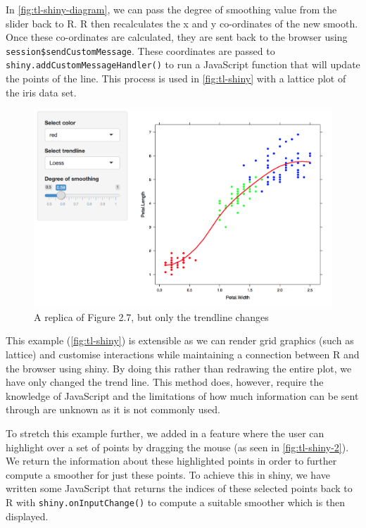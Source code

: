 \documentclass[11pt,]{report}
\begin{document}
In \autoref{fig:tl-shiny-diagram}, we can pass the degree of smoothing
value from the slider back to R. R then recalculates the x and y
co-ordinates of the new smooth. Once these co-ordinates are calculated,
they are sent back to the browser using
\texttt{session\$sendCustomMessage}. These coordinates are passed to
\texttt{shiny.addCustomMessageHandler()} to run a JavaScript function
that will update the points of the line. This process is used in
\autoref{fig:tl-shiny} with a lattice plot of the iris data set.

\begin{figure}[H]

{\centering \includegraphics[width=0.7\linewidth,]{./fig/tl-shiny} 

}

\caption{\label{fig:tl-shiny} A replica of Figure 2.7, but only the trendline changes}\label{fig:unnamed-chunk-37}
\end{figure}

This example (\autoref{fig:tl-shiny}) is extensible as we can render
\textsf{grid} graphics (such as \textsf{lattice}) and customise
interactions while maintaining a connection between R and the browser
using \textsf{shiny}. By doing this rather than redrawing the entire
plot, we have only changed the trend line. This method does, however,
require the knowledge of JavaScript and the limitations of how much
information can be sent through are unknown as it is not commonly used.

To stretch this example further, we added in a feature where the user
can highlight over a set of points by dragging the mouse (as seen in
\autoref{fig:tl-shiny-2}). We return the information about these
highlighted points in order to further compute a smoother for just these
points. To achieve this in \textsf{shiny}, we have written some
JavaScript that returns the indices of these selected points back to R
with \texttt{shiny.onInputChange()} to compute a suitable smoother which
is then displayed.
\end{document}
